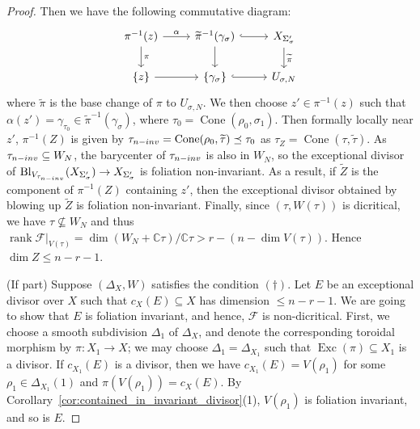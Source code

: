 \documentclass[12pt,reqno]{amsart}
\theoremstyle{definition}
\newcommand{\on}{\operatorname}
\newcommand\cF{{\mathcal{F}}}
\newcommand\bC{{\mathbb C}}
\begin{document}
\begin{proof}
    Then we have the following commutative diagram:
    \[
    \begin{tikzcd}
        \pi^{-1}(z)\arrow[r,"\alpha"]\arrow[d,"\pi"] &\widetilde\pi^{-1}(\gamma_\sigma) \arrow[d]\arrow[r,hook] &X_{\Sigma'_\sigma}\arrow[d,"\widetilde\pi"]\\
        \{z\} \arrow[r] & \{\gamma_\sigma\} \arrow[r,hook] & U_{\sigma,N}
    \end{tikzcd}
    \]
    where $\widetilde{\pi}$ is the base change of $\pi$ to $U_{\sigma,N}$. 
    We then choose $z'\in \pi^{-1}(z)$ such that $\alpha(z')=\gamma_{\tau_0}\in\widetilde\pi^{-1}(\gamma_\sigma)$, where $\tau_{0}=\on{Cone}(\rho_0,\sigma_1)$. Then formally locally near $z'$, $\pi^{-1}(Z)$ is given by $\tau_{\textnormal{n-inv}}=\on{Cone}(\rho_0,\widetilde\tau)\preceq \tau_0$ as $\tau_Z=\on{Cone}(\tau,\widetilde{\tau})$. As $\tau_{\textnormal{n-inv}}\subseteq W_N$, the barycenter of $\tau_{\textnormal{n-inv}}$ is also in $W_N$, so the exceptional divisor of $\on{Bl}_{V_{\tau_{\textnormal{n-inv}}}}(X_{\Sigma'_\sigma})\to X_{\Sigma'_\sigma}$ is foliation non-invariant. As a result, if $\widetilde Z$ is the component of $\pi^{-1}(Z)$ containing $z'$, then the exceptional divisor obtained by blowing up $\widetilde Z$ is foliation non-invariant. Finally, since $(\tau,W(\tau))$ is dicritical, we have $\tau \nsubseteq W_N$ and thus $\on{rank}\cF\vert_{V(\tau)}=\dim (W_N+\bC\tau)/\bC\tau>r-
    (n-\dim V(\tau))$. Hence $\dim Z\leq n-r-1$.

    (If part) Suppose $(\Delta_X,W)$ satisfies the condition $(\dagger)$. Let $E$ be an exceptional divisor over $X$ such that $c_X(E)\subseteq X$ has dimension $\leq n-r-1$. We are going to show that $E$ is foliation invariant, and hence, $\cF$ is non-dicritical. First, we choose a smooth subdivision $\Delta_{1}$ of $\Delta_X$, and denote the corresponding toroidal morphism by $\pi\colon X_1\to X$; we may choose $\Delta_1=\Delta_{X_1}$ such that $\on{Exc}(\pi)\subseteq X_1$ is a divisor. If $c_{X_1}(E)$ is a divisor, then we have $c_{X_1}(E) = V(\rho_1)$ for some $\rho_1\in \Delta_{X_1}(1)$ and $\pi(V(\rho_1)) = c_X(E)$. By Corollary~\ref{cor:contained_in_invariant_divisor}(1), $V(\rho_1)$ is foliation invariant, and so is $E$. 
    

\end{proof}
\end{document}
